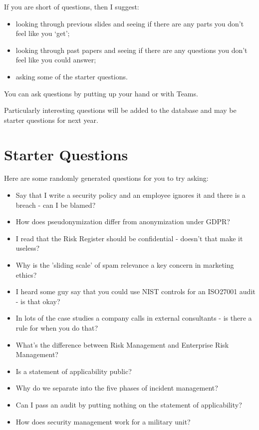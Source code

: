 \documentclass[12pt]{article}
\begin{document}
If you are short of questions, then I suggest: 

\begin{itemize} 
\item looking through previous slides and seeing if there are any parts you don't feel like you `get';
\item looking through past papers and seeing if there are any questions you don't feel like you could answer;
\item asking some of the starter questions.
\end{itemize} 

You can ask questions by putting up your hand or with Teams.  

Particularly interesting questions will be added to the database and may be starter questions for next year.  

\section*{Starter Questions} 
Here are some randomly generated questions for you to try asking: 

\begin{itemize}
  \item Say that I write a security policy and an employee ignores it and there is a breach - can I be blamed?
  \item How does pseudonymization differ from anonymization under GDPR?
  \item I read that the Risk Register should be confidential - doesn't that make it useless?
  \item Why is the 'sliding scale' of spam relevance a key concern in marketing ethics?
  \item I heard some guy say that you could use NIST controls for an ISO27001 audit - is that okay?
  \item In lots of the case studies a company calls in external consultants - is there a rule for when you do that?
  \item What's the difference between Risk Management and Enterprise Risk Management?
  \item Is a statement of applicability public?
  \item Why do we separate into the five phases of incident management?
  \item Can I pass an audit by putting nothing on the statement of applicability?
  \item How does security management work for a military unit?
\end{itemize}
\end{document}
